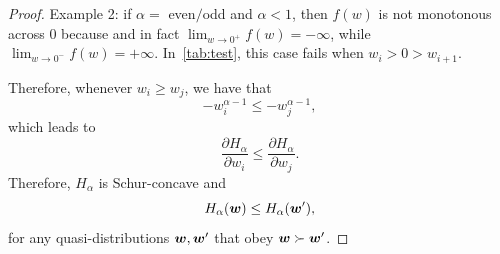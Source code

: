 \documentclass[pra,
aps,
twocolumn,
superscriptaddress,
groupedaddress,
nofootinbib,
reprint
]{revtex4-1}
\begin{document}
\begin{proof}
{Example 2: if $\alpha =$ even$/$odd and $\alpha < 1$, then  $f(w)$ is not monotonous across $0$ because and in fact $\lim_{w\rightarrow 0^+} f(w) = -\infty$, while $\lim_{w\rightarrow 0^-} f(w) = +\infty$. 
In~\cref{tab:test}, this case fails when $w_i > 0 > w_{i+1}$.
}

Therefore, whenever $w_i \geq w_j$, we have that 
\begin{equation}
	-w_i^{\alpha-1} \leq -w_j^{\alpha-1},
\end{equation}
which leads to
\begin{equation}
	\frac{\partial H_\alpha}{\partial w_i} \leq \frac{\partial H_\alpha}{\partial w_j}.
\end{equation}
Therefore, $H_\alpha$ is Schur-concave and
\begin{equation}
	H_\alpha(\boldsymbol{w}) \leq H_\alpha(\boldsymbol{w}'),
\end{equation}
for any quasi-distributions $\boldsymbol{w}, \boldsymbol{w}'$ that obey $\boldsymbol{w} \succ \boldsymbol{w}'$.



\end{proof}
\end{document}
